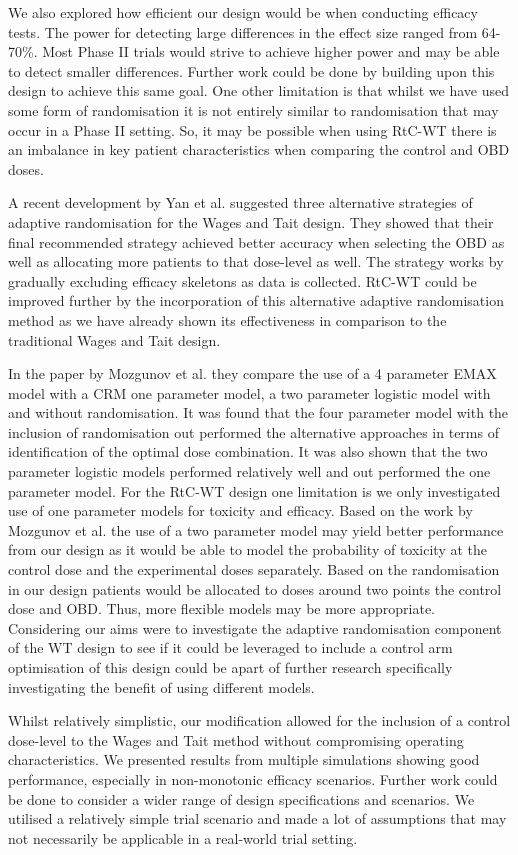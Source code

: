 We also explored how efficient our design would be when conducting efficacy tests. The power for detecting large differences in the effect size ranged from 64-70\%. Most Phase \RN{2} trials would strive to achieve higher power and may be able to detect smaller differences. Further work could be done by building upon this design to achieve this same goal. One other limitation is that whilst we have used some form of randomisation it is not entirely similar to randomisation that may occur in a Phase \RN{2} setting. So, it may be possible when using RtC-WT there is an imbalance in key patient characteristics when comparing the control and OBD doses.  

A recent development by Yan et al. \cite{yanImprovedAdaptiveRandomization2019} suggested three alternative strategies of adaptive randomisation for the Wages and Tait design. They showed that their final recommended strategy achieved better accuracy when selecting the OBD as well as allocating more patients to that dose-level as well. The strategy works by gradually excluding efficacy skeletons as data is collected. RtC-WT could be improved further by the incorporation of this alternative adaptive randomisation method as we have already shown its effectiveness in comparison to the traditional Wages and Tait design.  

In the paper by Mozgunov et al. \cite{mozgunovRandomizedDoseescalationDesigns2019} they compare the use of a 4 parameter EMAX model with a CRM one parameter model, a two parameter logistic model with and without randomisation. It was found that the four parameter model with the inclusion of randomisation out performed the alternative approaches in terms of identification of the optimal dose combination. It was also shown that the two parameter logistic models performed relatively well and out performed the one parameter model. For the RtC-WT design one limitation is we only investigated use of one parameter models for toxicity and efficacy. Based on the work by Mozgunov et al. \cite{mozgunovRandomizedDoseescalationDesigns2019} the use of a two parameter model may yield better performance from our design as it would be able to model the probability of toxicity at the control dose and the experimental doses separately. Based on the randomisation in our design patients would be allocated to doses around two points the control dose and OBD. Thus, more flexible models may be more appropriate. Considering our aims were to investigate the adaptive randomisation component of the WT design to see if it could be leveraged to include a control arm optimisation of this design could be apart of further research specifically investigating the benefit of using different models.

Whilst relatively simplistic, our modification allowed for the inclusion of a control dose-level to the Wages and Tait method without compromising operating characteristics. We presented results from multiple simulations showing good performance, especially in non-monotonic efficacy scenarios. Further work could be done to consider a wider range of design specifications and scenarios. We utilised a relatively simple trial scenario and made a lot of assumptions that may not necessarily be applicable in a real-world trial setting.  
